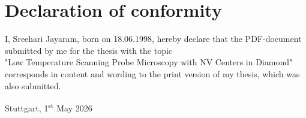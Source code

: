 \section*{Declaration of conformity}

I, Sreehari Jayaram,
born on 18.06.1998, 
hereby declare that the PDF-document submitted by me for the thesis with the topic \\
"Low Temperature Scanning Probe Microscopy with NV Centers in Diamond" \\
corresponds in content and wording to the print version of my thesis, which was also submitted.

\vspace{5em}
Stuttgart, 1\textsuperscript{st} May 2026
\vspace{5em}
\hrulefill \\